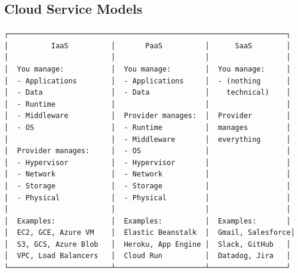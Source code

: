 \documentclass[11pt]{article}
\begin{document}
\subsection{Cloud Service Models}\label{cloud-service-models}

\setcodelang{}

\begin{verbatim}
┌─────────────────────────────────────────────────────────────────┐
│          IaaS          │       PaaS          │      SaaS        │
│                        │                     │                  │
│  You manage:           │  You manage:        │  You manage:     │
│  - Applications        │  - Applications     │  - (nothing      │
│  - Data                │  - Data             │    technical)    │
│  - Runtime             │                     │                  │
│  - Middleware          │  Provider manages:  │  Provider        │
│  - OS                  │  - Runtime          │  manages         │
│                        │  - Middleware       │  everything      │
│  Provider manages:     │  - OS               │                  │
│  - Hypervisor          │  - Hypervisor       │                  │
│  - Network             │  - Network          │                  │
│  - Storage             │  - Storage          │                  │
│  - Physical            │  - Physical         │                  │
│                        │                     │                  │
│  Examples:             │  Examples:          │  Examples:       │
│  EC2, GCE, Azure VM    │  Elastic Beanstalk  │  Gmail, Salesforce│
│  S3, GCS, Azure Blob   │  Heroku, App Engine │  Slack, GitHub   │
│  VPC, Load Balancers   │  Cloud Run          │  Datadog, Jira   │
└────────────────────────┴─────────────────────┴──────────────────┘
\end{verbatim}
\end{document}
